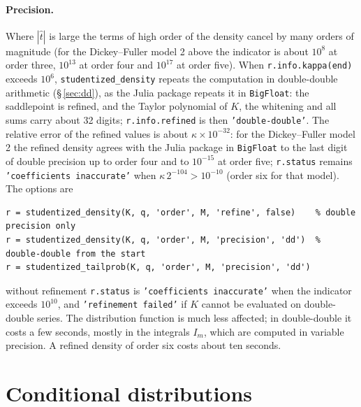 \documentclass[11pt]{article}
\newcommand{\prog}[1]{\texttt{#1}}
\begin{document}
\paragraph{Precision.} Where $|\hat t|$ is large the terms of high order of the density cancel by
many orders of magnitude (for the Dickey--Fuller model 2 above the indicator is about $10^{8}$ at
order three, $10^{13}$ at order four and $10^{17}$ at order five). When \prog{r.info.kappa(end)}
exceeds $10^6$, \prog{studentized\_density} repeats the computation in double-double arithmetic
(\S\,\ref{sec:dd}), as the Julia package repeats it in \prog{BigFloat}: the saddlepoint is refined, and
the Taylor polynomial of $K$, the whitening and all sums carry about 32 digits; \prog{r.info.refined}
is then \prog{'double-double'}. The relative error of the refined values is about
$\kappa\times10^{-32}$: for the Dickey--Fuller model 2 the refined density agrees with the Julia
package in \prog{BigFloat} to the last digit of double precision up to order four and to $10^{-15}$ at
order five; \prog{r.status} remains \prog{'coefficients inaccurate'} when
$\kappa\,2^{-104}>10^{-10}$ (order six for that model). The options are
\begin{lstlisting}
r = studentized_density(K, q, 'order', M, 'refine', false)    % double precision only
r = studentized_density(K, q, 'order', M, 'precision', 'dd')  % double-double from the start
r = studentized_tailprob(K, q, 'order', M, 'precision', 'dd')
\end{lstlisting}
without refinement \prog{r.status} is \prog{'coefficients inaccurate'} when the indicator exceeds
$10^{10}$, and \prog{'refinement failed'} if $K$ cannot be evaluated on double-double series. The
distribution function is much less affected; in double-double it costs a few seconds, mostly in the
integrals $I_m$, which are computed in variable precision. A refined density of order six costs about
ten seconds.

\section{Conditional distributions}\label{sec:cond}
\end{document}

